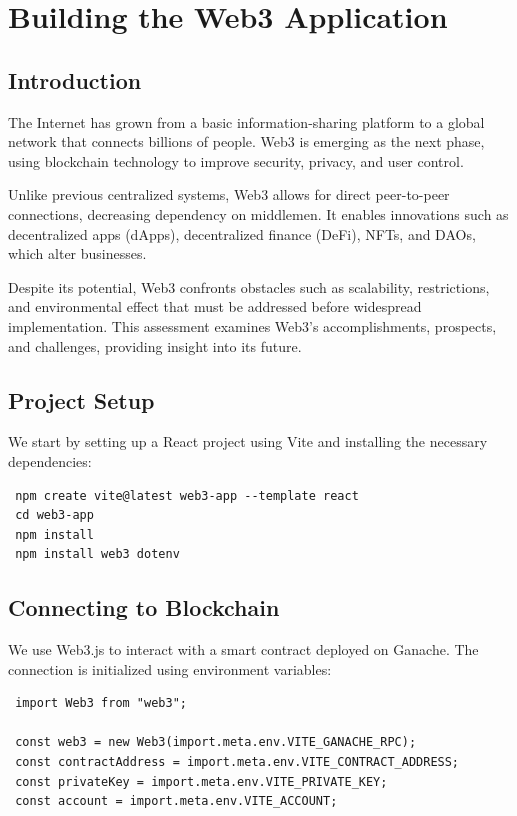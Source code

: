 \documentclass[a4paper,12pt]{report}
\begin{document}
\chapter{Building the Web3 Application}
\section{Introduction}
The Internet has grown from a basic information-sharing platform to a global network that connects billions of people\cite{aria2023influential}\cite{nabben2023web3}\cite{murray2023promise}.  Web3 is emerging as the next phase, using blockchain technology to improve security, privacy, and user control\cite{tennakoon2023smart}\cite{sadowski2023expansive}.

 Unlike previous centralized systems, Web3 allows for direct peer-to-peer connections, decreasing dependency on middlemen.  It enables innovations such as decentralized apps (dApps), decentralized finance (DeFi), NFTs, and DAOs, which alter businesses\cite{cong2023inclusion}.

 Despite its potential, Web3 confronts obstacles such as scalability, restrictions, and environmental effect that must be addressed before widespread implementation\cite{lacity2023quiet}\cite{wang2023novel}.  This assessment examines Web3's accomplishments, prospects, and challenges, providing insight into its future.

 \section{Project Setup}
 We start by setting up a React project using Vite and installing the necessary dependencies:
 
 \begin{lstlisting}
 npm create vite@latest web3-app --template react
 cd web3-app
 npm install
 npm install web3 dotenv
 \end{lstlisting}
 
 \section{Connecting to Blockchain}
 We use Web3.js to interact with a smart contract deployed on Ganache. The connection is initialized using environment variables:
 
 \begin{lstlisting}
 import Web3 from "web3";
 
 const web3 = new Web3(import.meta.env.VITE_GANACHE_RPC);
 const contractAddress = import.meta.env.VITE_CONTRACT_ADDRESS;
 const privateKey = import.meta.env.VITE_PRIVATE_KEY;
 const account = import.meta.env.VITE_ACCOUNT;
 \end{lstlisting}
 
\end{document}

